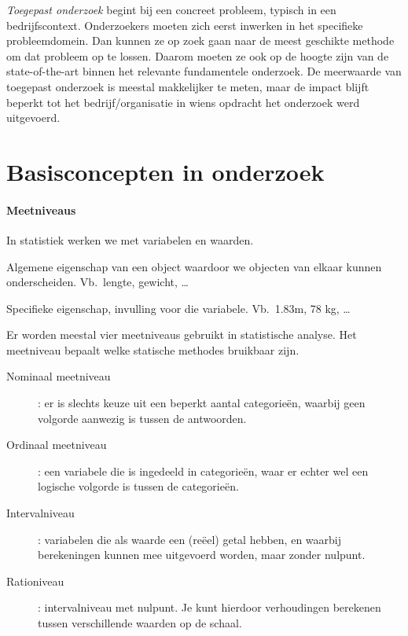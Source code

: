\emph{Toegepast onderzoek} begint bij een concreet probleem, typisch in een bedrijfscontext. Onderzoekers moeten zich eerst inwerken in het specifieke probleemdomein. Dan kunnen ze op zoek gaan naar de meest geschikte methode om dat probleem op te lossen. Daarom moeten ze ook op de hoogte zijn van de state-of-the-art binnen het relevante fundamentele onderzoek. De meerwaarde van toegepast onderzoek is meestal makkelijker te meten, maar de impact blijft beperkt tot het bedrijf/organisatie in wiens opdracht het onderzoek werd uitgevoerd.

\section{Basisconcepten in onderzoek}

\paragraph{Meetniveaus}

In statistiek werken we met variabelen en waarden.

\begin{definition}[Variabele] 
  Algemene eigenschap van een object waardoor we objecten van elkaar kunnen onderscheiden. Vb.~lengte, gewicht, \ldots
\end{definition}  
\begin{definition}[Waarde]
  Specifieke eigenschap, invulling voor die variabele. Vb.~1.83m, 78 kg, \ldots
\end{definition}

Er worden meestal vier meetniveaus gebruikt in statistische analyse. Het meetniveau bepaalt welke statische methodes bruikbaar zijn.

\begin{description}
  \item [Nominaal meetniveau] : er is slechts keuze uit een beperkt aantal categorie\"en, waarbij geen volgorde aanwezig is tussen de antwoorden.
  \item [Ordinaal meetniveau] : een variabele die is ingedeeld in categorie\"en, waar er echter wel een logische volgorde is tussen de categorieën. 
  \item [Intervalniveau] : variabelen die als waarde een (reëel) getal hebben, en waarbij berekeningen kunnen mee uitgevoerd worden, maar zonder nulpunt.
  \item [Rationiveau] : intervalniveau met nulpunt. Je kunt hierdoor verhoudingen berekenen tussen verschillende waarden op de schaal.
\end{description}

